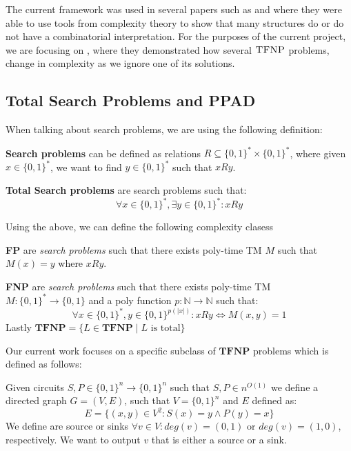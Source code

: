The current framework was used in several papers such as
\cite{ikenmeyerWhatWhatNot2022} and \cite{ikenmeyerPositivitySymmetricGroup2024}
where they were able to use tools from complexity theory to show that
many structures do or do not have a combinatorial interpretation.
For the purposes of the current project, we are focusing on \cite{ikenmeyerWhatWhatNot2022},
where they demonstrated how several $\textsc{TFNP}$ problems, 
change in complexity as we ignore one of its solutions.

\subsection{Total Search Problems and PPAD}
When talking about search problems, we are using the following definition:

\begin{definition}
    \textbf{Search problems} can be defined as relations $R \subseteq \{0,1\}^* \times \{0,1\}^*$,
    where given $x \in \{0,1\}^*$, we want to find $y \in \{0,1\}^*$  such that $x Ry$.

    \textbf{Total Search problems} are search problems such that:
    $$
    \forall x \in \{0,1\}^*, \exists y \in \{0,1\}^* : xRy
    $$
\end{definition}

Using the above, we can define the following complexity clasess

\begin{definition}
    \textbf{FP} are \textit{search problems} such that there exists poly-time TM $M$
    such that $M(x) = y$ where $x Ry$.

    \textbf{FNP} are \textit{search problems} such that there exists poly-time TM $M: \{0,1\}^* \to \{0,1\}$
    and a poly function $p : \mathbb{N} \to \mathbb{N}$ such that:
    $$
    \forall x \in \{0,1\}^*, y \in \{0,1\}^{p(|x|)}: xRy \iff M(x,y) = 1
    $$
    Lastly $\textbf{TFNP} = \{L \in \textbf{TFNP} \mid L \text{ is total}\}$
\end{definition}

Our current work focuses on a specific subclass of $\textbf{TFNP}$ problems
which is defined as follows:

\begin{definition}
    Given circuits $S, P \in \{0,1\}^n \to \{0,1\}^n$ such that $S,P \in n^{O(1)}$
    we define a directed graph $G = (V,E)$, such that $V= \{0,1\}^n$ and $E$ defined as:
    $$
    E = \{(x,y) \in V^2: S(x) = y \wedge P(y) = x\}
    $$
    We define are source or sinks $\forall v \in V: \textit{deg}(v) = (0,1)$ or
    $\textit{deg}(v) = (1,0)$, respectively. We want to output
    $v$ that is either a source or a sink.
\end{definition}



